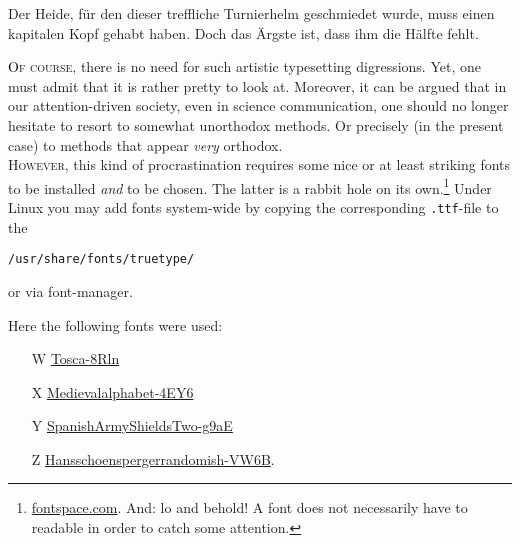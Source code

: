 \epigraph{Der Heide, für den dieser treffliche Turnierhelm geschmiedet wurde, muss einen kapitalen Kopf gehabt haben. Doch das Ärgste ist, dass ihm die Hälfte fehlt.}{}

\lettrine[lines=3, loversize=0.1]{\textcolor{black}{\Examplefontii O}}{f course}, there is no need for such artistic typesetting digressions. Yet, one must admit that it is rather pretty to look at. Moreover, it can be argued that in our attention-driven society, even in science communication, one should no longer hesitate to resort to somewhat unorthodox methods. Or precisely (in the present case) to methods that appear \emph{very} orthodox.
\\

\lettrine[lines=3, loversize=0.1]{\textcolor{\colorforcurvesi}{\Examplefonti H}}{owever}, this kind of procrastination requires some nice or at least striking fonts to be installed \emph{and} to be chosen. The latter is a rabbit hole on its own.\footnote{\Eg \href{https://www.fontspace.com/}{fontspace.com}. And: lo and behold! A font does not necessarily have to readable in order to catch some attention.
\vspace{5mm}

\scalebox{1.5}{\LARGE \Examplefontiii A B C E F }
\vspace{2mm}

\scalebox{1.5}{\LARGE \Examplefontiii G H I J K}
\vspace{2mm}

\scalebox{1.5}{\LARGE \Examplefontiii L M N O P}

} Under Linux you may add fonts system-wide by copying the corresponding \verb|.ttf|-file to the 

{\centering \verb|/usr/share/fonts/truetype/|\par}

or via font-manager.

Here the following fonts were used:
\begin{itemize}
	\item[\Large \Examplefontiii W] \href{https://www.fontspace.com/tosca-font-f10033}{Tosca-8Rln}
	\item[\Large \Examplefontiii X] \href{https://www.fontspace.com/medievalalphabet-font-f13634}{Medievalalphabet-4EY6}
	\item[\Large \Examplefontiii Y] \href{https://www.fontspace.com/spanish-army-shields-two-font-f16698}{SpanishArmyShieldsTwo-g9aE}
	\item[\Large \Examplefontiii Z] \href{https://www.fontspace.com/hansschoenspergerrandomish-font-f8903}{Hansschoenspergerrandomish-VW6B}.
\end{itemize}

